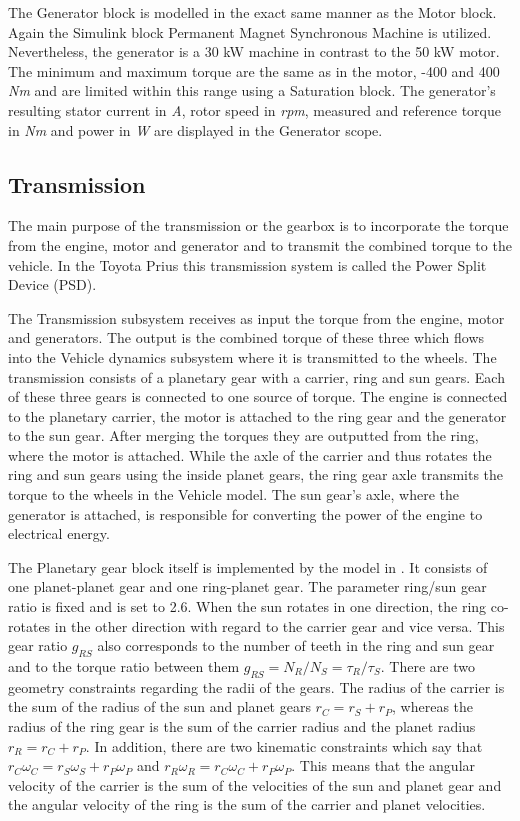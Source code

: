 The Generator block is modelled in the exact same manner as the Motor block. Again the Simulink block Permanent Magnet Synchronous Machine \citep{pmsmMatlab} is utilized. Nevertheless, the generator is a 30 kW machine in contrast to the 50 kW motor. The minimum and maximum torque are the same as in the motor, -400 and 400 \textit{Nm} and are limited within this range using a Saturation block. The generator's resulting stator current in \textit{A}, rotor speed in \textit{rpm}, measured and reference torque in \textit{Nm} and power in \textit{W} are displayed in the Generator scope.

\subsection{Transmission}
The main purpose of the transmission or the gearbox is to incorporate the torque from the engine, motor and generator and to transmit the combined torque to the vehicle. In the Toyota Prius this transmission system is called the Power Split Device (PSD). 

The Transmission subsystem receives as input the torque from the engine, motor and generators. The output is the combined torque of these three which flows into the Vehicle dynamics subsystem where it is transmitted to the wheels. The transmission consists of a planetary gear with a carrier, ring and sun gears. Each of these three gears is connected to one source of torque. The engine is connected to the planetary carrier, the motor is attached to the ring gear and the generator to the sun gear. After merging the torques they are outputted from the ring, where the motor is attached. While the axle of the carrier and thus rotates the ring and sun gears using the inside planet gears, the ring gear axle transmits the torque to the wheels in the Vehicle model. The sun gear's axle, where the generator is attached, is responsible for converting the power of the engine to electrical energy.

The Planetary gear block itself is implemented by the model in \citet{planetMatlab}. It consists of one planet-planet gear and one ring-planet gear. The parameter ring/sun gear ratio is fixed and is set to 2.6. When the sun rotates in one direction, the ring co-rotates in the other direction with regard to the carrier gear and vice versa. This gear ratio $g_{RS}$ also corresponds to the number of teeth in the ring and sun gear and to the torque ratio between them $g_{RS} = N_R/N_S = \tau_R/\tau_S$. There are two geometry constraints regarding the radii of the gears. The radius of the carrier is the sum of the radius of the sun and planet gears $r_C = r_S + r_P$, whereas the radius of the ring gear is the sum of the carrier radius and the planet radius $r_R = r_C + r_P$. In addition, there are two kinematic constraints which say that $r_C\omega_C = r_S\omega_S + r_P\omega_P$ and $r_R\omega_R = r_C\omega_C + r_P\omega_P$. This means that the angular velocity of the carrier is the sum of the velocities of the sun and planet gear and the angular velocity of the ring is the sum of the carrier and planet velocities.

